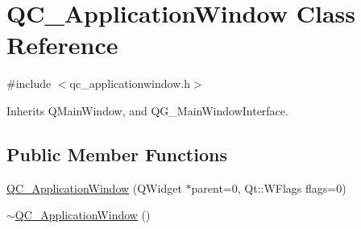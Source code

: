 \hypertarget{class_q_c___application_window}{\section{Q\-C\-\_\-\-Application\-Window Class Reference}
\label{class_q_c___application_window}
}


{\ttfamily \#include $<$qc\-\_\-applicationwindow.\-h$>$}



Inherits Q\-Main\-Window, and Q\-G\-\_\-\-Main\-Window\-Interface.

\subsection*{Public Member Functions}
\begin{DoxyCompactItemize}
\item 
\hyperlink{class_q_c___application_window_ab334fd10172e65413a67f02243b4d2ba}{Q\-C\-\_\-\-Application\-Window} (Q\-Widget $\ast$parent=0, Qt\-::\-W\-Flags flags=0)
\item 
\hyperlink{class_q_c___application_window_ad38a31b69c0fbb030bd0180218e1be44}{$\sim$\-Q\-C\-\_\-\-Application\-Window} ()
\end{DoxyCompactItemize}


